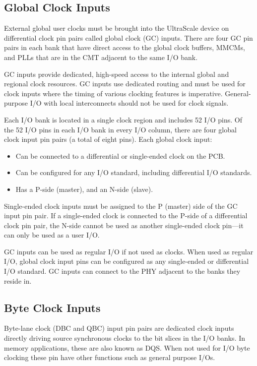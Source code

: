 \documentclass[12pt, a4paper]{report}
\begin{document}
    \subsection{Global Clock Inputs}
    External global user clocks must be brought into the UltraScale device on differential clock pin pairs called global clock (GC) inputs. There are four GC pin pairs in each bank that have direct access to the global clock buffers, MMCMs, and PLLs that are in the CMT adjacent to
    the same I/O bank. 
    
    GC inputs provide dedicated, high-speed access to the internal global and regional clock resources. GC inputs use dedicated routing
    and must be used for clock inputs where the timing of various clocking features is imperative. General-purpose I/O with local interconnects should not be used for clock signals.

    Each I/O bank is located in a single clock region and includes 52 I/O pins. Of the 52 I/O pins in each I/O bank in every I/O column, there are four global clock input pin pairs (a total of
    eight pins). Each global clock input:

    \begin{itemize}
        \item Can be connected to a differential or single-ended clock on the PCB.
        \item Can be configured for any I/O standard, including differential I/O standards.
        \item Has a P-side (master), and an N-side (slave).
    \end{itemize}

    Single-ended clock inputs must be assigned to the P (master) side of the GC input pin pair. If a single-ended clock is connected to the P-side of a differential clock pin pair, the N-side cannot be used as another single-ended clock pin—it can only be used as a user I/O. 
    
    GC inputs can be used as regular I/O if not used as clocks. When used as regular I/O, global clock input pins can be configured as any single-ended or differential I/O standard. GC inputs can connect to the PHY adjacent to the banks they reside in.

    \subsection{Byte Clock Inputs}
    Byte-lane clock (DBC and QBC) input pin pairs are dedicated clock inputs directly driving source synchronous clocks to the bit slices in the I/O banks. In memory applications, these are also known as DQS. When not used for I/O byte clocking these pin have other functions such as general purpose I/Os. 
\end{document}
